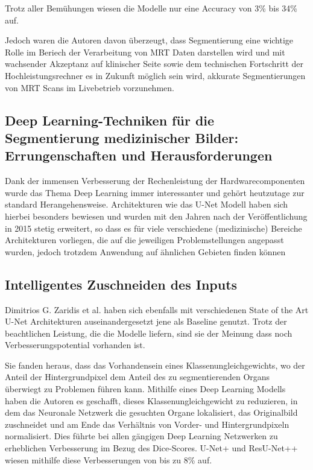 Trotz aller Bemühungen wiesen die Modelle nur eine Accuracy von 3\% bis 34\% auf. \citep{Clarke:Mri1995}

Jedoch waren die Autoren davon überzeugt, dass Segmentierung eine wichtige Rolle im Beriech der Verarbeitung von MRT Daten darstellen wird und mit wachsender Akzeptanz auf klinischer Seite sowie dem technischen Fortschritt der Hochleistungsrechner es in Zukunft möglich sein wird, akkurate Segmentierungen von MRT Scans im Livebetrieb vorzunehmen.

\newpage

\subsection{Deep Learning-Techniken für die Segmentierung medizinischer Bilder:
Errungenschaften und Herausforderungen}

Dank der immensen Verbesserung der Rechenleistung der Hardwarecomponenten wurde das Thema Deep Learning immer interessanter und gehört heutzutage zur standard Herangehensweise. Architekturen wie das U-Net Modell \citep{U-Net} haben sich hierbei besonders bewiesen und wurden mit den Jahren nach der Veröffentlichung in 2015 stetig erweitert, so dass es für viele verschiedene (medizinische) Bereiche Architekturen vorliegen, die auf die jeweiligen Problemstellungen angepasst wurden, jedoch trotzdem Anwendung auf ähnlichen Gebieten finden können \citep{Hesamian}

\subsection{Intelligentes Zuschneiden des Inputs}

Dimitrios G. Zaridis et al. \citep{SmartCrop} haben sich ebenfalls mit verschiedenen State of the Art U-Net Architekturen auseinandergesetzt jene als Baseline genutzt. Trotz der beachtlichen Leistung, die die Modelle liefern, sind sie der Meinung dass noch Verbesserungspotential vorhanden ist.

Sie fanden heraus, dass das Vorhandensein eines Klassenungleichgewichts, wo der Anteil der Hintergrundpixel dem Anteil des zu segmentierenden Organs überwiegt zu Problemen führen kann. Mithilfe eines Deep Learning Modells haben die Autoren es geschafft, dieses Klassenungleichgewicht zu reduzieren, in dem das Neuronale Netzwerk die gesuchten Organe lokalisiert, das Originalbild zuschneidet und am Ende das Verhältnis von Vorder- und Hintergrundpixeln normalisiert. Dies führte bei allen gängigen Deep Learning Netzwerken zu erheblichen Verbesserung im Bezug des Dice-Scores. U-Net+ und ResU-Net++ wiesen mithilfe diese Verbesserungen von bis zu 8\% auf.

